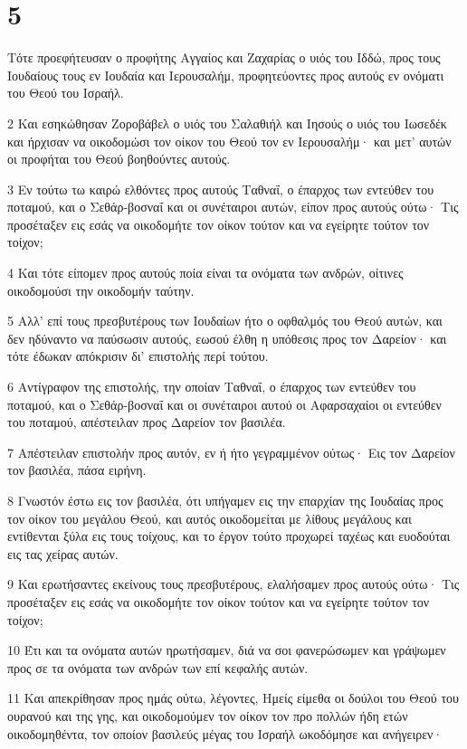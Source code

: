 \chapter{5}

\par Τότε προεφήτευσαν ο προφήτης Αγγαίος και Ζαχαρίας ο υιός του Ιδδώ, προς τους Ιουδαίους τους εν Ιουδαία και Ιερουσαλήμ, προφητεύοντες προς αυτούς εν ονόματι του Θεού του Ισραήλ.
\par 2 Και εσηκώθησαν Ζοροβάβελ ο υιός του Σαλαθιήλ και Ιησούς ο υιός του Ιωσεδέκ και ήρχισαν να οικοδομώσι τον οίκον του Θεού τον εν Ιερουσαλήμ· και μετ' αυτών οι προφήται του Θεού βοηθούντες αυτούς.
\par 3 Εν τούτω τω καιρώ ελθόντες προς αυτούς Ταθναΐ, ο έπαρχος των εντεύθεν του ποταμού, και ο Σεθάρ-βοσναΐ και οι συνέταιροι αυτών, είπον προς αυτούς ούτω· Τις προσέταξεν εις εσάς να οικοδομήτε τον οίκον τούτον και να εγείρητε τούτον τον τοίχον;
\par 4 Και τότε είπομεν προς αυτούς ποία είναι τα ονόματα των ανδρών, οίτινες οικοδομούσι την οικοδομήν ταύτην.
\par 5 Αλλ' επί τους πρεσβυτέρους των Ιουδαίων ήτο ο οφθαλμός του Θεού αυτών, και δεν ηδύναντο να παύσωσιν αυτούς, εωσού έλθη η υπόθεσις προς τον Δαρείον· και τότε έδωκαν απόκρισιν δι' επιστολής περί τούτου.
\par 6 Αντίγραφον της επιστολής, την οποίαν Ταθναΐ, ο έπαρχος των εντεύθεν του ποταμού, και ο Σεθάρ-βοσναΐ και οι συνέταιροι αυτού οι Αφαρσαχαίοι οι εντεύθεν του ποταμού, απέστειλαν προς Δαρείον τον βασιλέα.
\par 7 Απέστειλαν επιστολήν προς αυτόν, εν ή ήτο γεγραμμένον ούτως· Εις τον Δαρείον τον βασιλέα, πάσα ειρήνη.
\par 8 Γνωστόν έστω εις τον βασιλέα, ότι υπήγαμεν εις την επαρχίαν της Ιουδαίας προς τον οίκον του μεγάλου Θεού, και αυτός οικοδομείται με λίθους μεγάλους και εντίθενται ξύλα εις τους τοίχους, και το έργον τούτο προχωρεί ταχέως και ευοδούται εις τας χείρας αυτών.
\par 9 Και ερωτήσαντες εκείνους τους πρεσβυτέρους, ελαλήσαμεν προς αυτούς ούτω· Τις προσέταξεν εις εσάς να οικοδομήτε τον οίκον τούτον και να εγείρητε τούτον τον τοίχον;
\par 10 Έτι και τα ονόματα αυτών ηρωτήσαμεν, διά να σοι φανερώσωμεν και γράψωμεν προς σε τα ονόματα των ανδρών των επί κεφαλής αυτών.
\par 11 Και απεκρίθησαν προς ημάς ούτω, λέγοντες, Ημείς είμεθα οι δούλοι του Θεού του ουρανού και της γης, και οικοδομούμεν τον οίκον τον προ πολλών ήδη ετών οικοδομηθέντα, τον οποίον βασιλεύς μέγας του Ισραήλ ωκοδόμησε και ανήγειρεν·
